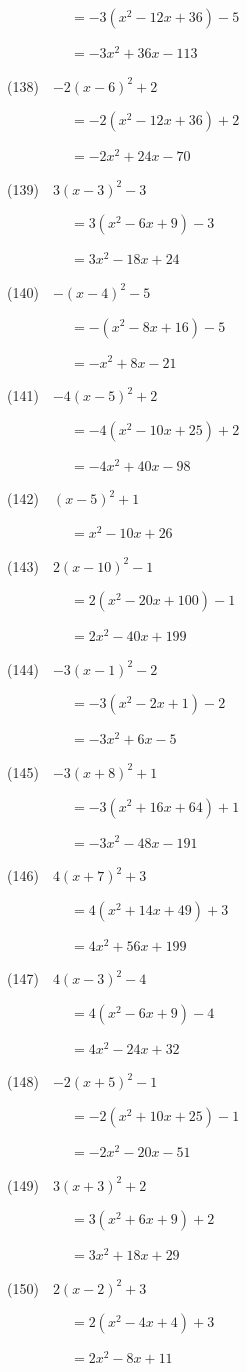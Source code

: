 \documentclass[a4j,twocolumn,10pt,fleqn]{jarticle}
\begin{document}
~~~~~~~~~$=-3(x^2-12x +36)-5$

~~~~~~~~~$=-3x^2 +36x-113$

(138)~~$-2(x-6)^2 +2$

~~~~~~~~~$=-2(x^2-12x +36) +2$

~~~~~~~~~$=-2x^2 +24x-70$

(139)~~$3(x-3)^2-3$

~~~~~~~~~$=3(x^2-6x +9)-3$

~~~~~~~~~$=3x^2-18x +24$

(140)~~$-(x-4)^2-5$

~~~~~~~~~$=-(x^2-8x +16)-5$

~~~~~~~~~$=-x^2 +8x-21$

(141)~~$-4(x-5)^2 +2$

~~~~~~~~~$=-4(x^2-10x +25) +2$

~~~~~~~~~$=-4x^2 +40x-98$

(142)~~$(x-5)^2 +1$

~~~~~~~~~$=x^2-10x +26$

(143)~~$2(x-10)^2-1$

~~~~~~~~~$=2(x^2-20x +100)-1$

~~~~~~~~~$=2x^2-40x +199$

(144)~~$-3(x-1)^2-2$

~~~~~~~~~$=-3(x^2-2x +1)-2$

~~~~~~~~~$=-3x^2 +6x-5$

(145)~~$-3(x +8)^2 +1$

~~~~~~~~~$=-3(x^2 +16x +64) +1$

~~~~~~~~~$=-3x^2-48x-191$

(146)~~$4(x +7)^2 +3$

~~~~~~~~~$=4(x^2 +14x +49) +3$

~~~~~~~~~$=4x^2 +56x +199$

(147)~~$4(x-3)^2-4$

~~~~~~~~~$=4(x^2-6x +9)-4$

~~~~~~~~~$=4x^2-24x +32$

(148)~~$-2(x +5)^2-1$

~~~~~~~~~$=-2(x^2 +10x +25)-1$

~~~~~~~~~$=-2x^2-20x-51$

(149)~~$3(x +3)^2 +2$

~~~~~~~~~$=3(x^2 +6x +9) +2$

~~~~~~~~~$=3x^2 +18x +29$

(150)~~$2(x-2)^2 +3$

~~~~~~~~~$=2(x^2-4x +4) +3$

~~~~~~~~~$=2x^2-8x +11$
\end{document}

